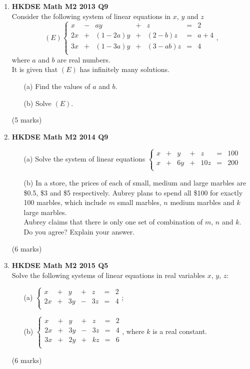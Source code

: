 \documentclass{report}
\begin{document}
\begin{enumerate}
	\item \textbf{HKDSE Math M2 2013 Q9}\\
	Consider the following system of linear equations in $x$, $y$ and $z$
		$$(E)  \left\{\begin{matrix}
		x & - & ay & + & z & = & 2\\
		2x & + & (1-2a)y & + & (2-b)z  & =  & a+4\\
		3x & + & (1-3a)y & + & (3-ab)z & = & 4\\
		\end{matrix}\right.,$$where $a$ and $b$ are real numbers. \\
		It is given that $(E)$ has infinitely many solutions.
	\begin{enumerate}
		\item [(a)]Find the values of $a$ and $b$.
		\item [(b)]Solve $(E)$.
	\end{enumerate}
	(5 marks)

	\newpage
	
	\item \textbf{HKDSE Math M2 2014 Q9}
	\begin{enumerate}
		\item [(a)]Solve the system of linear equations $\left\{
		\begin{matrix}
			x & + & y & + & z & = & 100\\
			x & + & 6y& + &10z& = & 200\\
		\end{matrix}\right.$
		\item [(b)]In a store, the prices of each of small, medium and large marbles are \$0.5, \$3 and \$5 respectively. Aubrey plans to spend all \$100 for exactly 100 marbles, which include $m$ small marbles, $n$ medium marbles and $k$ large marbles.\\
		Aubrey claims that there is only one set of combination of $m$, $n$ and $k$. Do you agree? Explain your answer.
	\end{enumerate}
	(6 marks)	

	\item \textbf{HKDSE Math M2 2015 Q5}\\
	Solve the following systems of linear equations in real variables $x$, $y$, $z$:
	\begin{enumerate}
		\item [(a)]$\left\{
			\begin{matrix}
				x&+&y&+&z&=&2\\
				2x&+&3y&-&3z&=&4\\
			\end{matrix}\right.$;
		\item [(b)]$\left\{
			\begin{matrix}
				x&+&y&+&z&=&2\\
				2x&+&3y&-&3z&=&4\\
				3x&+&2y&+&kz&=&6\\
			\end{matrix}\right.$, where $k$ is a real constant.
	\end{enumerate}
	(6 marks)


\end{enumerate}
\end{document}
